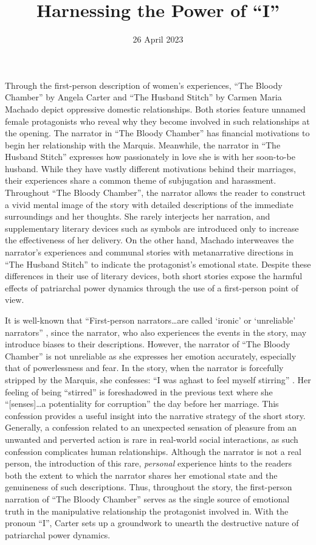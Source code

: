\documentclass{mla}
\date{26 April 2023}
\title{Harnessing the Power of ``I''}
\begin{document}
Through the first-person description of women's experiences, ``The Bloody Chamber'' by Angela Carter and ``The Husband Stitch'' by Carmen Maria Machado depict oppressive domestic relationships.
Both stories feature unnamed female protagonists who reveal why they become involved in such relationships at the opening.
The narrator in ``The Bloody Chamber'' has financial motivations to begin her relationship with the Marquis.
Meanwhile, the narrator in ``The Husband Stitch'' expresses how passionately in love she is with her soon-to-be husband.
While they have vastly different motivations behind their marriages, their experiences share a common theme of subjugation and harassment.
Throughout ``The Bloody Chamber'', the narrator allows the reader to construct a vivid mental image of the story with detailed descriptions of the immediate surroundings and her thoughts.
She rarely interjects her narration, and supplementary literary devices such as symbols are introduced only to increase the effectiveness of her delivery.
On the other hand, Machado interweaves the narrator's experiences and communal stories with metanarrative directions in ``The Husband Stitch'' to indicate the protagonist's emotional state.
Despite these differences in their use of literary devices, both short stories expose the harmful effects of patriarchal power dynamics through the use of a first-person point of view.

It is well-known that ``First-person narrators\ldots are called `ironic' or `unreliable' narrators'' \autocite[][175]{glossary}, since the narrator, who also experiences the events in the story, may introduce biases to their descriptions.
However, the narrator of ``The Bloody Chamber'' is not unreliable as she expresses her emotion accurately, especially that of powerlessness and fear.
In the story, when the narrator is forcefully stripped by the Marquis, she confesses: ``I was aghast to feel myself stirring'' \autocite[][12]{carter}.
Her feeling of being ``stirred'' is foreshadowed in the previous text where she ``[senses]\ldots a potentiality for corruption'' \autocite[][7]{carter} the day before her marriage.
This confession provides a useful insight into the narrative strategy of the short story.
Generally, a confession related to an unexpected sensation of pleasure from an unwanted and perverted action is rare in real-world social interactions, as such confession complicates human relationships.
Although the narrator is not a real person, the introduction of this rare, \textit{personal} experience hints to the readers both the extent to which the narrator shares her emotional state and the genuineness of such descriptions.
Thus, throughout the story, the first-person narration of ``The Bloody Chamber'' serves as the single source of emotional truth in the manipulative relationship the protagonist involved in.
With the pronoun ``I'', Carter sets up a groundwork to unearth the destructive nature of patriarchal power dynamics.
\end{document}
